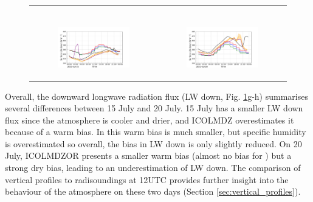\begin{figure}[hbtp]
\begin{tabular}{cc}
\begin{subfigure}[t]{0.5\textwidth}
        \end{subfigure} \\
        \begin{subfigure}[t]{0.5\textwidth}
            \caption{}
            \includegraphics[width=\textwidth]{images/chap5/IOP_TS/TS_2021-07-15_cendrosa_LWdnSFC.png}
        \end{subfigure} &
        \begin{subfigure}[t]{0.5\textwidth}
            \caption{}
            \includegraphics[width=\textwidth]{images/chap5/IOP_TS/TS_2021-07-20_cendrosa_LWdnSFC.png}
        \end{subfigure}
    \end{tabular}
    \caption{}
    \label{fig:iop_days_TS_energy}
\end{figure}

Overall, the downward longwave radiation flux (LW down, Fig. \ref{fig:iop_days_TS_energy}g-h) summarises several differences between 15 July and 20 July. 15 July has a smaller LW down flux since the atmosphere is cooler and drier, and ICOLMDZ overestimates it because of a warm bias. In \irrboost this warm bias is much smaller, but specific humidity is overestimated so overall, the bias in LW down is only slightly reduced. 
On 20 July, ICOLMDZOR presents a smaller warm bias (almost no bias for \irrboost) but a strong dry bias, leading to an underestimation of LW down. The comparison of vertical profiles to radisoundings at 12UTC  provides further insight into the behaviour of the atmosphere on these two days (Section \ref{sec:vertical_profiles}).

